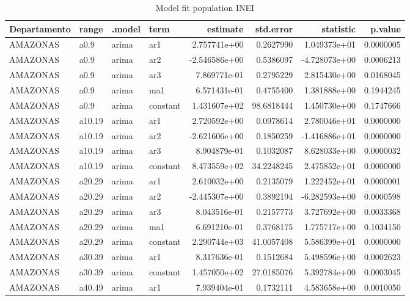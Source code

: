 \documentclass[
]{article}
\begin{document}
\begin{table}[!h]

\caption{\label{tab:fite}Model fit population INEI}
\centering
\begin{tabular}[t]{llllrrrr}
\toprule
Departamento & range & .model & term & estimate & std.error & statistic & p.value\\
\midrule
AMAZONAS & a0.9 & arima & ar1 & 2.757741e+00 & 0.2627990 & 1.049373e+01 & 0.0000005\\
AMAZONAS & a0.9 & arima & ar2 & -2.546586e+00 & 0.5386097 & -4.728073e+00 & 0.0006213\\
AMAZONAS & a0.9 & arima & ar3 & 7.869771e-01 & 0.2795229 & 2.815430e+00 & 0.0168045\\
AMAZONAS & a0.9 & arima & ma1 & 6.571431e-01 & 0.4755400 & 1.381888e+00 & 0.1944245\\
AMAZONAS & a0.9 & arima & constant & 1.431607e+02 & 98.6818444 & 1.450730e+00 & 0.1747666\\
\addlinespace
AMAZONAS & a10.19 & arima & ar1 & 2.720592e+00 & 0.0978614 & 2.780046e+01 & 0.0000000\\
AMAZONAS & a10.19 & arima & ar2 & -2.621606e+00 & 0.1850259 & -1.416886e+01 & 0.0000000\\
AMAZONAS & a10.19 & arima & ar3 & 8.904879e-01 & 0.1032087 & 8.628033e+00 & 0.0000032\\
AMAZONAS & a10.19 & arima & constant & 8.473559e+02 & 34.2248245 & 2.475852e+01 & 0.0000000\\
AMAZONAS & a20.29 & arima & ar1 & 2.610032e+00 & 0.2135079 & 1.222452e+01 & 0.0000001\\
\addlinespace
AMAZONAS & a20.29 & arima & ar2 & -2.445307e+00 & 0.3892194 & -6.282593e+00 & 0.0000598\\
AMAZONAS & a20.29 & arima & ar3 & 8.043516e-01 & 0.2157773 & 3.727692e+00 & 0.0033368\\
AMAZONAS & a20.29 & arima & ma1 & 6.691210e-01 & 0.3768175 & 1.775717e+00 & 0.1034150\\
AMAZONAS & a20.29 & arima & constant & 2.290744e+03 & 41.0057408 & 5.586399e+01 & 0.0000000\\
AMAZONAS & a30.39 & arima & ar1 & 8.317636e-01 & 0.1512684 & 5.498596e+00 & 0.0002623\\
\addlinespace
AMAZONAS & a30.39 & arima & constant & 1.457050e+02 & 27.0185076 & 5.392784e+00 & 0.0003045\\
AMAZONAS & a40.49 & arima & ar1 & 7.939404e-01 & 0.1732111 & 4.583658e+00 & 0.0010050\\

\end{tabular}
\end{table}
\end{document}
